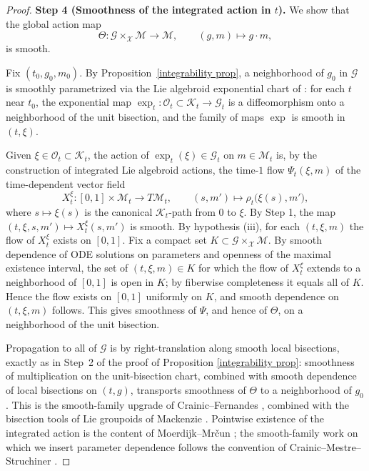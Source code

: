 \documentclass[reqno]{amsart}
\theoremstyle{plain}
\theoremstyle{definition}
\newcommand{\G}{\mathcal{G}}
\renewcommand{\O}{\mathcal{O}}
\newcommand{\M}{\mathcal{M}}
\newcommand{\X}{\mathcal{X}}
\newcommand{\K}{\mathcal{K}}
\begin{document}
\begin{proof}
\medskip
\noindent\textbf{Step 4 (Smoothness of the integrated action in $t$).}
We show that the global action map
\[
   \Theta \colon \mathcal{G} \times_{\mathcal{X}} \mathcal{M} \longrightarrow \mathcal{M},
   \qquad (g, m) \longmapsto g \cdot m,
\]
is smooth.
 
Fix $(t_0, g_0, m_0)$. By Proposition~\ref{integrability prop},
a neighborhood of $g_0$ in $\mathcal{G}$ is smoothly parametrized via the Lie algebroid exponential chart of \cite{mackenzie2005general}: for each $t$
near $t_0$, the exponential map
$\exp_t \colon \mathcal{O}_t \subset \mathcal{K}_t \to \mathcal{G}_t$
is a diffeomorphism onto a neighborhood of the unit bisection, and the family of maps $\exp$ is smooth in $(t, \xi)$.
 
Given $\xi \in \O_t \subset \K_t$, the action of
$\exp_t(\xi) \in \G_t$ on $m \in \M_t$ is, by the construction of integrated Lie algebroid actions, the
time-$1$ flow $\Psi_t(\xi, m)$ of the time-dependent vector field
\[
   X_t^{\xi} \colon [0,1] \times \M_t \longrightarrow T\M_t,
   \qquad (s, m') \longmapsto \rho_t\bigl(\xi(s), m'\bigr),
\]
where $s \mapsto \xi(s)$ is the canonical $\mathcal{K}_t$-path from $0$ to $\xi$.
By Step 1, the map $(t, \xi, s, m') \mapsto X_t^{\xi}(s, m')$ is smooth. By hypothesis (iii), for each $(t, \xi, m)$ the flow of $X_t^{\xi}$ exists on $[0, 1]$. Fix a compact set $K \subset \G \times_{\X} \M$.
By smooth dependence of ODE solutions on parameters and openness of the
maximal existence interval, the set of $(t, \xi, m) \in K$ for which the flow of $X_t^{\xi}$ extends to a neighborhood of $[0, 1]$ is open in $K$; by fiberwise completeness it equals all of $K$. Hence the flow exists on $[0, 1]$ uniformly on $K$, and smooth dependence on $(t, \xi, m)$ follows.
This gives smoothness of $\Psi$, and hence of $\Theta$, on a neighborhood of the unit bisection.
 
Propagation to all of $\mathcal{G}$ is by right-translation along smooth local bisections, exactly as in Step~2 of the proof of
Proposition \ref{integrability prop}: smoothness of multiplication
on the unit-bisection chart, combined with smooth dependence of local
bisections on $(t, g)$, transports smoothness of $\Theta$ to a neighborhood of $g_0$. This is the smooth-family upgrade of Crainic–Fernandes \cite{crainic2003integrability},  combined with the bisection tools of Lie groupoids of Mackenzie \cite{mackenzie2005general}. Pointwise existence of the integrated action is the content of  Moerdijk–Mrčun \cite{moerdijk2002integrability}; the smooth-family work on which we insert parameter dependence follows the convention of Crainic–Mestre–Struchiner \cite{crainic2020deformations}. 
 

\end{proof}
\end{document}
